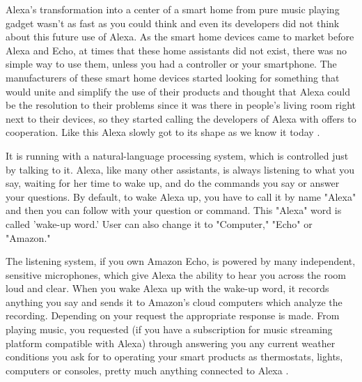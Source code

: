 \documentclass[
  digital, %
  oneside, %
  table,   %
  lof,     %
  lot,     %
]{fithesis3}
\begin{document}
Alexa's transformation into a center of a smart home from pure music playing gadget wasn't as fast as you could think and even its developers did not think about this future use of Alexa. As the smart home devices came to market before Alexa and Echo, at times that these home assistants did not exist, there was no simple way to use them, unless you had a controller or your smartphone. The manufacturers of these smart home devices started looking for something that would unite and simplify the use of their products and thought that Alexa could be the resolution to their problems since it was there in people's living room right next to their devices, so they started calling the developers of Alexa with offers to cooperation. Like this Alexa slowly got to its shape as we know it today \parencite{alexa_businessinsider}.

It is running with a natural-language processing system, which is controlled just by talking to it. Alexa, like many other assistants, is always listening to what you say, waiting for her time to wake up, and do the commands you say or answer your questions. By default, to wake Alexa up, you have to call it by name "Alexa" and then you can follow with your question or command. This "Alexa" word is called 'wake-up word.' User can also change it to "Computer," "Echo" or "Amazon." 

The listening system, if you own Amazon Echo, is powered by many independent, sensitive microphones, which give Alexa the ability to hear you across the room loud and clear. When you wake Alexa up with the wake-up word, it records anything you say and sends it to Amazon's cloud computers which analyze the recording. Depending on your request the appropriate response is made. From playing music, you requested (if you have a subscription for music streaming platform compatible with Alexa) through answering you any current weather conditions you ask for to operating your smart products as thermostats, lights, computers or consoles, pretty much anything connected to Alexa \parencite{alexa_wirecutter}.
\end{document}
